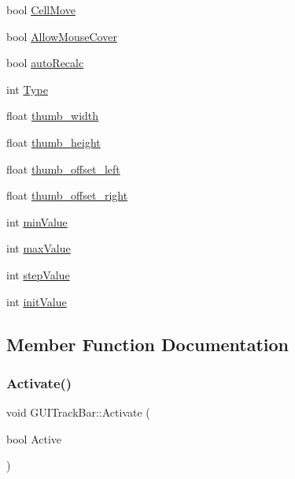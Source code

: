 \begin{DoxyCompactItemize}
\item 
bool \hyperlink{class_g_u_i_track_bar_aecdfa30ea1ab74433bbe6691868f950a}{Cell\+Move}
\item 
bool \hyperlink{class_g_u_i_track_bar_aff7de6859ddc922912fb9b6fc82af73b}{Allow\+Mouse\+Cover}
\item 
bool \hyperlink{class_g_u_i_track_bar_ab69ca992a3564c1122f85d5257b6e3da}{auto\+Recalc}
\item 
int \hyperlink{class_g_u_i_track_bar_aadf2e4a9a09064f3b7c2e3c940e07f27}{Type}
\item 
float \hyperlink{class_g_u_i_track_bar_a2f5472c04c8722115751fe22a7432d9e}{thumb\+\_\+width}
\item 
float \hyperlink{class_g_u_i_track_bar_a57e036088de683b918099453b8c4e456}{thumb\+\_\+height}
\item 
float \hyperlink{class_g_u_i_track_bar_a1c56188be242a20f800a11cfc17c1392}{thumb\+\_\+offset\+\_\+left}
\item 
float \hyperlink{class_g_u_i_track_bar_a52e1eb8a48584bab51616fe0260b34a1}{thumb\+\_\+offset\+\_\+right}
\item 
int \hyperlink{class_g_u_i_track_bar_a46f8a1aea46302d179de091cc052f597}{min\+Value}
\item 
int \hyperlink{class_g_u_i_track_bar_a4b35512ac6cda45daee5d317ba6c729a}{max\+Value}
\item 
int \hyperlink{class_g_u_i_track_bar_ad4448a7c35bcf9d20d21ee2dc817e92a}{step\+Value}
\item 
int \hyperlink{class_g_u_i_track_bar_a517eb53e3b733f3b291958778906e32b}{init\+Value}
\end{DoxyCompactItemize}


\subsection{Member Function Documentation}
\hypertarget{class_g_u_i_track_bar_a8ff92f9ee55fbb4bd6c4fccc2c7f7f0e}{}\label{class_g_u_i_track_bar_a8ff92f9ee55fbb4bd6c4fccc2c7f7f0e} 
\subsubsection{\texorpdfstring{Activate()}{Activate()}}
{\footnotesize\ttfamily void G\+U\+I\+Track\+Bar\+::\+Activate (\begin{DoxyParamCaption}\item[{bool}]{Active }\end{DoxyParamCaption})}

